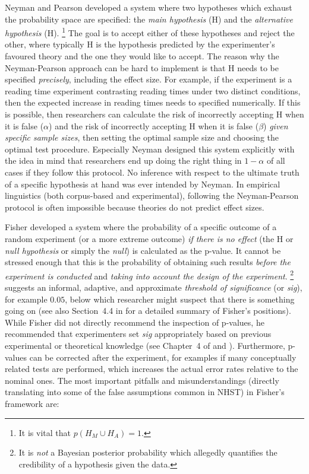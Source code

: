 Neyman and Pearson developed a system where two hypotheses which exhaust the probability space are specified:
the \textit{main hypothesis} (H) and the \textit{alternative hypothesis} (H).%
\footnote{It is vital that $p(H_M\cup H_A)=1$.}
The goal is to accept either of these hypotheses and reject the other, where typically H is the hypothesis predicted by the experimenter's favoured theory and the one they would like to accept.
The reason why the Neyman-Pearson approach can be hard to implement is that H needs to be specified \textit{precisely}, \ie including the effect size.
For example, if the experiment is a reading time experiment contrasting reading times under two distinct conditions, then the expected increase in reading times needs to specified numerically.
If this is possible, then researchers can calculate the risk of incorrectly accepting H when it is false ($\alpha$) and the risk of incorrectly accepting H when it is false ($\beta$) \textit{given specific sample sizes}, then setting the optimal sample size and choosing the optimal test procedure.
Especially Neyman designed this system explicitly with the idea in mind that researchers end up doing the right thing in $1-\alpha$ of all cases if they follow this protocol.
No inference with respect to the ultimate truth of a specific hypothesis at hand was ever intended by Neyman.
In empirical linguistics (both corpus-based and experimental), following the Neyman-Pearson protocol is often impossible because theories do not predict effect sizes.

Fisher developed a system where the probability of a specific outcome of a random experiment (or a more extreme outcome) \textit{if there is no effect} (the H or \textit{null hypothesis} or simply the \textit{null}) is calculated as the p-value.
It cannot be stressed enough that this is the probability of obtaining such results \textit{before the experiment is conducted} and \textit{taking into account the design of the experiment}.%
\footnote{It is \textit{not} a Bayesian posterior probability which allegedly quantifies the credibility of a hypothesis given the data.}
\textcite[504]{Fisher1926} suggests an informal, adaptive, and approximate \textit{threshold of significance} (or \textit{sig}), for example $0.05$, below which researcher might suspect that there is something going on (see also Section~4.4 in \citealt{Lehmann2011} for a detailed summary of Fisher's positions).
While Fisher did not directly recommend the inspection of p-values, he recommended that experimenters set \textit{sig} appropriately based on previous experimental or theoretical knowledge (see Chapter~4 of \citealt{Lehmann2011} and \citealt{Perezgonzalez2015}).
Furthermore, p-values can be corrected after the experiment, for examples if many conceptually related tests are performed, which increases the actual error rates relative to the nominal ones.
The most important pitfalls and misunderstandings (directly translating into some of the false assumptions common in NHST) in Fisher's framework are:

